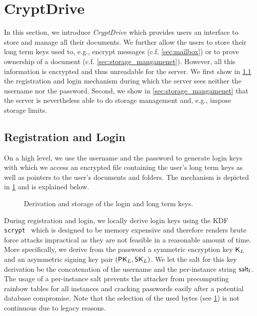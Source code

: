 \section{CryptDrive}
\label{sec:cryptdrive}
In this section, we introduce \textit{CryptDrive} which provides users an interface to store and manage all their documents.
We further allow the users to store their long term keys used to, e.g., encrypt messages (c.f. \cref{sec:mailbox}) or to prove ownership of a document (c.f. \cref{sec:storage_mangamenet}).
However, all this information is encrypted and thus unreadable for the server.
We first show in \cref{sec:login} the registration and login mechanism during which the server sees neither the username nor the password.
Second, we show in \cref{sec:storage_mangamenet} that the server is nevertheless able to do storage management and, e.g., impose storage limits.

\subsection{Registration and Login}
\label{sec:login}
On a high level, we use the username and the password to generate login keys with which we access an encrypted file containing the user's long term keys as well as pointers to the user's documents and folders.
The mechanism is depicted in \cref{fig:login_mechanism} and is explained below.

\begin{figure}[t!]
  \centering
  
  \caption{Derivation and storage of the login and long term keys.}
  \label{fig:login_mechanism}
\end{figure}

During registration and login, we locally derive login keys using the \ac{KDF} \texttt{scrypt}~\cite{Percival2009} which is designed to be memory expensive and therefore renders brute force attacks impractical as they are not feasible in a reasonable amount of time.
More specifically, we derive from the password a symmetric encryption key $\mySymKey_L$ and an asymmetric signing key pair $\myKeyPair{_L}$.
We let the salt for this key derivation be the concatenation of the username and the per-instance string $\myAlgofont{salt_I}$.
The usage of a per-instance salt prevents the attacker from precomputing rainbow tables for all instances and cracking passwords easily after a potential database compromise.
Note that the selection of the used bytes (see \cref{fig:login_mechanism}) is not continuous due to legacy reasons.

